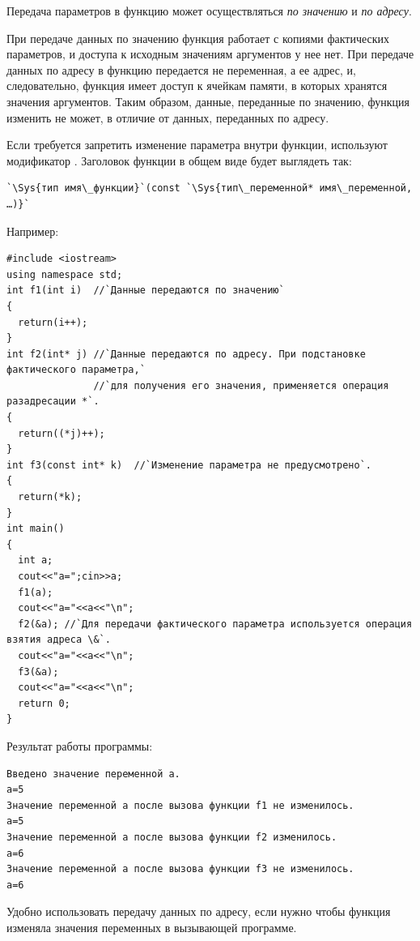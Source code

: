 Передача параметров в функцию может осуществляться \emph{по
значению} и \emph{по адресу}. 

При передаче данных по значению функция работает с копиями фактических параметров, и доступа к исходным значениям
аргументов у нее нет. При передаче данных по адресу в функцию передается не переменная, а ее адрес, и, следовательно,
функция имеет доступ к ячейкам памяти, в которых хранятся значения аргументов. Таким образом, данные, переданные по
значению, функция изменить не может, в отличие от данных, переданных по адресу. 

Если требуется запретить изменение параметра внутри функции, используют модификатор . Заголовок
функции в общем виде будет выглядеть так:
\begin{lstlisting}
`\Sys{тип имя\_функции}`(const `\Sys{тип\_переменной* имя\_переменной, …)}`
\end{lstlisting}

Например:
\begin{lstlisting}
#include <iostream>
using namespace std;
int f1(int i)  //`Данные передаются по значению`
{
  return(i++);
}
int f2(int* j) //`Данные передаются по адресу. При подстановке фактического параметра,` 
               //`для получения его значения, применяется операция разадресации *`.
{
  return((*j)++);
}
int f3(const int* k)  //`Изменение параметра не предусмотрено`.
{
  return(*k);
}
int main()
{
  int a;
  cout<<"a=";cin>>a;
  f1(a);
  cout<<"a="<<a<<"\n";
  f2(&a); //`Для передачи фактического параметра используется операция взятия адреса \&`.
  cout<<"a="<<a<<"\n";
  f3(&a);
  cout<<"a="<<a<<"\n";
  return 0;
}
\end{lstlisting}

Результат работы программы:
\begin{verbatim}
Введено значение переменной a.
a=5 
Значение переменной a после вызова функции f1 не изменилось.
a=5 
Значение переменной a после вызова функции f2 изменилось.
a=6 
Значение переменной a после вызова функции f3 не изменилось.
a=6 
\end{verbatim}

Удобно использовать передачу данных по адресу, если нужно чтобы функция изменяла значения переменных в вызывающей
программе.

